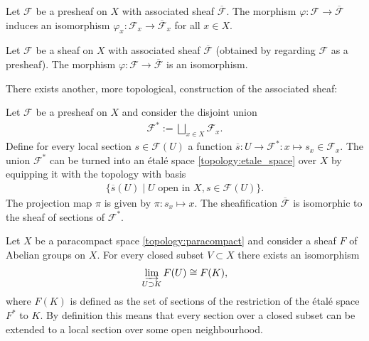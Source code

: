     \begin{property}[Stalks]
        Let $\mathcal{F}$ be a presheaf on $X$ with associated sheaf $\overline{\mathcal{F}}$. The morphism $\varphi:\mathcal{F}\rightarrow\overline{\mathcal{F}}$ induces an isomorphism $\varphi_x:\mathcal{F}_x\rightarrow\overline{\mathcal{F}}_x$ for all $x\in X$.
    \end{property}
    \begin{property}
        Let $\mathcal{F}$ be a sheaf on $X$ with associated sheaf $\overline{\mathcal{F}}$ (obtained by regarding $\mathcal{F}$ as a presheaf). The morphism $\varphi:\mathcal{F}\rightarrow\overline{\mathcal{F}}$ is an isomorphism.
    \end{property}

    There exists another, more topological, construction of the associated sheaf:
    \begin{construct}\label{sheaf:etale_construction}
        Let $\mathcal{F}$ be a presheaf on $X$ and consider the disjoint union
        \begin{gather}
            \mathcal{F}^* := \bigsqcup_{x\in X}\mathcal{F}_x.
        \end{gather}
        Define for every local section $s\in\mathcal{F}(U)$ a function $\overline{s}:U\rightarrow\mathcal{F}^*:x\mapsto s_x\in\mathcal{F}_x$. The union $\mathcal{F}^*$ can be turned into an \'etal\'e space \ref{topology:etale_space} over $X$ by equipping it with the topology with basis
        \begin{gather}
            \big\{\overline{s}(U)\mid U\text{ open in }X, s\in\mathcal{F}(U)\big\}.
        \end{gather}
        The projection map $\pi$ is given by $\pi:s_x\mapsto x$. The sheafification $\overline{\mathcal{F}}$ is isomorphic to the sheaf of sections of $\mathcal{F}^*$.
    \end{construct}

    \begin{property}
        Let $X$ be a paracompact space \ref{topology:paracompact} and consider a sheaf $F$ of Abelian groups on $X$. For every closed subset $V\subset X$ there exists an isomorphism
        \begin{gather}
            \varinjlim_{U\supset K}F(U)\cong F(K),
        \end{gather}
        where $F(K)$ is defined as the set of sections of the restriction of the \'etal\'e space $F^*$ to $K$. By definition this means that every section over a closed subset can be extended to a local section over some open neighbourhood.
    \end{property}

